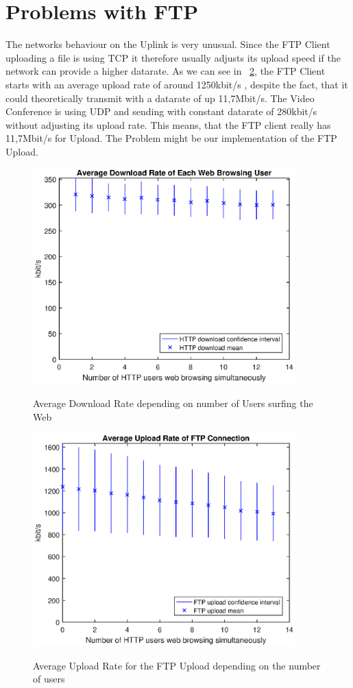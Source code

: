 \documentclass[a4paper,10pt]{book}\usepackage{graphicx}
\begin{document}
\section{Problems with FTP}
The networks behaviour on the Uplink is very unusual. Since the FTP Client uploading a file is using TCP it therefore usually adjusts its upload speed if the network can provide a higher datarate.
As we can see in ~\ref{fig:ftpUpR}, the FTP Client starts with an average upload rate of around 1250kbit/s , despite the fact, that it could theoretically transmit with a datarate of up  11,7Mbit/s.
The Video Conference is using UDP and sending with constant datarate of 280kbit/s without adjusting its upload rate. This means, that the FTP client really has 11,7Mbit/s for Upload.
The Problem might be our implementation of the FTP Upload. 

\begin{figure}[!ht]
  \centering
    \includegraphics[width=0.9\textwidth]{off_http_download.eps}
    \label{fig:httpDR}
    \caption{Average Download Rate depending on number of Users surfing the Web}
\end{figure}

\begin{figure}[!ht]
  \centering
    \includegraphics[width=0.9\textwidth]{off_ftp_upload.eps}
    \label{fig:ftpUpR}
    \caption{Average Upload Rate for the FTP Upload depending on the number of users}
\end{figure}
\end{document}
